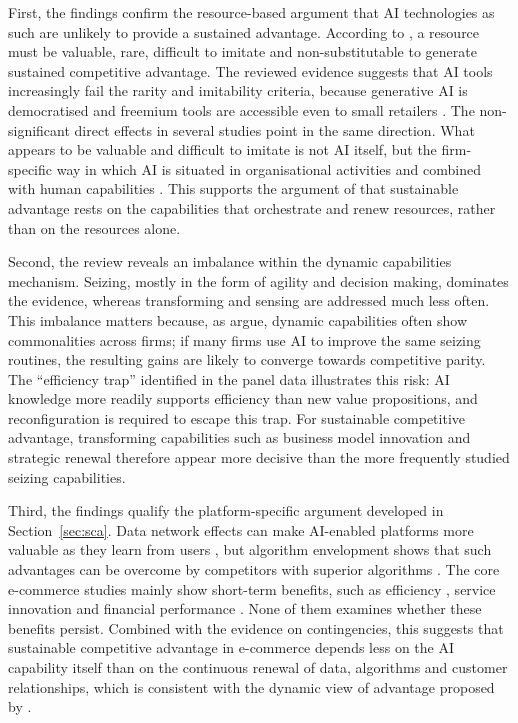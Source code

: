 First, the findings confirm the resource-based argument that AI technologies as such are unlikely to provide a sustained advantage. According to \textcite[99]{barney1991}, a resource must be valuable, rare, difficult to imitate and non-substitutable to generate sustained competitive advantage. The reviewed evidence suggests that AI tools increasingly fail the rarity and imitability criteria, because generative AI is democratised  and freemium tools are accessible even to small retailers . The non-significant direct effects in several studies point in the same direction. What appears to be valuable and difficult to imitate is not AI itself, but the firm-specific way in which AI is situated in organisational activities  and combined with human capabilities . This supports the argument of \textcite[1319]{teece2007} that sustainable advantage rests on the capabilities that orchestrate and renew resources, rather than on the resources alone.

Second, the review reveals an imbalance within the dynamic capabilities mechanism. Seizing, mostly in the form of agility and decision making, dominates the evidence, whereas transforming and sensing are addressed much less often. This imbalance matters because, as \textcite[1105]{eisenhardt2000} argue, dynamic capabilities often show commonalities across firms; if many firms use AI to improve the same seizing routines, the resulting gains are likely to converge towards competitive parity. The \enquote{efficiency trap} identified in the panel data  illustrates this risk: AI knowledge more readily supports efficiency than new value propositions, and reconfiguration is required to escape this trap. For sustainable competitive advantage, transforming capabilities such as business model innovation  and strategic renewal  therefore appear more decisive than the more frequently studied seizing capabilities.

Third, the findings qualify the platform-specific argument developed in Section~\ref{sec:sca}. Data network effects can make AI-enabled platforms more valuable as they learn from users , but algorithm envelopment shows that such advantages can be overcome by competitors with superior algorithms . The core e-commerce studies mainly show short-term benefits, such as efficiency , service innovation  and financial performance . None of them examines whether these benefits persist. Combined with the evidence on contingencies, this suggests that sustainable competitive advantage in e-commerce depends less on the AI capability itself than on the continuous renewal of data, algorithms and customer relationships, which is consistent with the dynamic view of advantage proposed by \textcite[509]{teece1997}.

